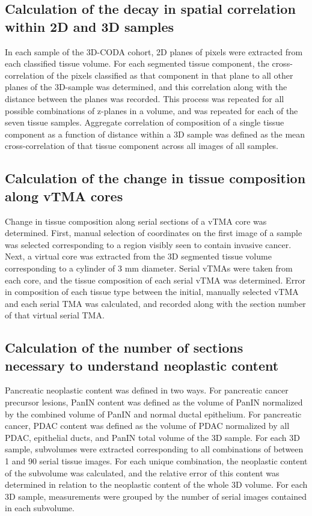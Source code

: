 \begin{refsection}
    \subsection{Calculation of the decay in spatial correlation within 2D and 3D samples}
    In each sample of the 3D-CODA cohort, 2D planes of pixels were extracted from each classified tissue volume. For each segmented tissue component, the cross-correlation of the pixels classified as that component in that plane to all other planes of the 3D-sample was determined, and this correlation along with the distance between the planes was recorded. This process was repeated for all possible combinations of z-planes in a volume, and was repeated for each of the seven tissue samples. Aggregate correlation of composition of a single tissue component as a function of distance within a 3D sample was defined as the mean cross-correlation of that tissue component across all images of all samples.
    
    \subsection{Calculation of the change in tissue composition along vTMA cores}
    Change in tissue composition along serial sections of a vTMA core was determined. First, manual selection of coordinates on the first image of a sample was selected corresponding to a region visibly seen to contain invasive cancer. Next, a virtual core was extracted from the 3D segmented tissue volume corresponding to a cylinder of 3 mm diameter. Serial vTMAs were taken from each core, and the tissue composition of each serial vTMA was determined. Error in composition of each tissue type between the initial, manually selected vTMA and each serial TMA was calculated, and recorded along with the section number of that virtual serial TMA. 
    
    \subsection{Calculation of the number of sections necessary to understand neoplastic content}
    Pancreatic neoplastic content was defined in two ways. For pancreatic cancer precursor lesions, PanIN content was defined as the volume of PanIN normalized by the combined volume of PanIN and normal ductal epithelium. For pancreatic cancer, PDAC content was defined as the volume of PDAC normalized by all PDAC, epithelial ducts, and PanIN total volume of the 3D sample. For each 3D sample, subvolumes were extracted corresponding to all combinations of between 1 and 90 serial tissue images. For each unique combination, the neoplastic content of the subvolume was calculated, and the relative error of this content was determined in relation to the neoplastic content of the whole 3D volume. For each 3D sample, measurements were grouped by the number of serial images contained in each subvolume.
    

\end{refsection}
